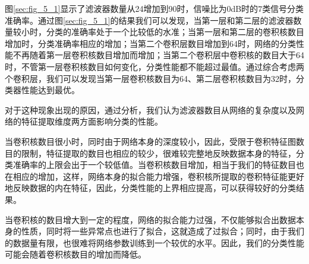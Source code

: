 图\ref{sec:fig_5_1}显示了滤波器数量从24增加到90时，信噪比为0dB时的$7$类信号分类准确率。通过图\ref{sec:fig_5_1}的结果我们可以发现，当第一层和第二层的滤波器数量较小时，分类的准确率处于一个比较低的水准；当第一层和第二层的卷积核数目增加时，分类准确率相应的增加；当第二个卷积层数目增加到64时，网络的分类性能不再随着第一层卷积核数目增加而增加；当第二个卷积层中卷积核的数目大于64时，不管第一层卷积核数目如何变化，分类性能都不能超过最值。通过综合考虑两个卷积层，我们可以发现当第一层卷积核数目为64、第二层卷积核数目为32时，分类器性能达到最优。\par
对于这种现象出现的原因，通过分析，我们认为滤波器数目从网络的复杂度以及网络的特征提取维度两方面影响分类的性能。\par
当卷积核数目很小时，同时由于网络本身的深度较小，因此，受限于卷积特征图数目的限制，特征提取的数目也相应的较少，很难较完整地反映数据本身的特征，分类准确率的上限会出于一个较低值。当卷积核数目增加，相当于我们的特征数目也在相应的增加，这样，网络本身的拟合能力增强，卷积核所提取的卷积特征能更好地反映数据的内在特征，因此，分类性能的上界相应提高，可以获得较好的分类结果。\par
当卷积核的数目增大到一定的程度，网络的拟合能力过强，不仅能够拟合出数据本身的性质，同时将一些异常点也进行了拟合，这就造成了过拟合；同时，由于我们的数据量有限，也很难将网络参数训练到一个较优的水平。因此，我们的分类性能可能会随着卷积核数目的增加而降低。\par

